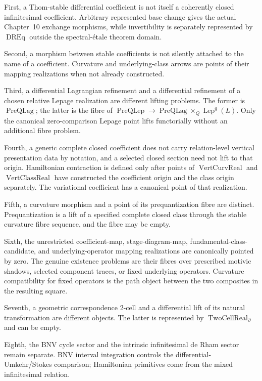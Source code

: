 First, a Thom-stable differential coefficient is not itself a coherently closed
infinitesimal coefficient.  Arbitrary represented base change gives the actual
Chapter~10 exchange morphisms, while invertibility is separately represented by
$\operatorname{DREq}$ outside the spectral-\'etale theorem domain.

Second, a morphism between stable coefficients is not silently attached to the
name of a coefficient.  Curvature and underlying-class arrows are points of their
mapping realizations when not already constructed.

Third, a differential Lagrangian refinement and a differential refinement of a
chosen relative Lepage realization are different lifting problems.  The former is
$\operatorname{PreQLag}$; the latter is the fibre of
$\operatorname{PreQLep}\to\operatorname{PreQLag}\times_Q\operatorname{Lep}^q(L)$.
Only the canonical zero-comparison Lepage point lifts functorially without an
additional fibre problem.

Fourth, a generic complete closed coefficient does not carry relation-level
vertical presentation data by notation, and a selected closed section need not lift
to that origin.  Hamiltonian contraction is defined only after points of
$\operatorname{VertCurvReal}$ and $\operatorname{VertClassReal}$ have constructed
the coefficient origin and the class origin separately.
The variational coefficient has a canonical point of that realization.

Fifth, a curvature morphism and a point of its prequantization fibre are distinct.
Prequantization is a lift of a specified complete closed class through the stable
curvature fibre sequence, and the fibre may be empty.

Sixth, the unrestricted coefficient-map, stage-diagram-map,
fundamental-class-candidate, and underlying-operator mapping realizations are
canonically pointed by zero.  The genuine existence problems are their fibres
over prescribed motivic shadows, selected component traces, or fixed underlying
operators.  Curvature compatibility for fixed operators is the path object between
the two composites in the resulting square.

Seventh, a geometric correspondence $2$-cell and a differential lift of its
natural transformation are different objects.  The latter is represented by
$\operatorname{TwoCellReal}_{\partial}$ and can be empty.

Eighth, the BNV cycle sector and the intrinsic infinitesimal de Rham sector remain
separate.  BNV interval integration controls the differential-Umkehr/Stokes
comparison; Hamiltonian primitives come from the mixed infinitesimal relation.

